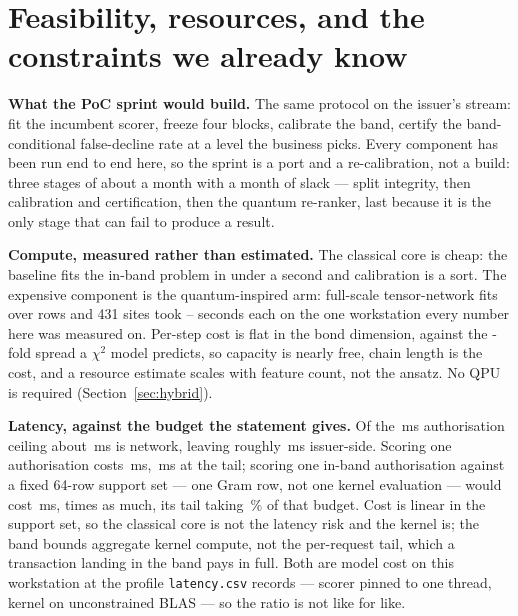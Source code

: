 \section{Feasibility, resources, and the constraints we already know}
\label{sec:feasibility}

\textbf{What the PoC sprint would build.} The same protocol on the issuer's stream: fit the
incumbent scorer, freeze four blocks, calibrate the band, certify the band-conditional
false-decline rate at a level the business picks. Every component has been run end to end here, so the sprint is a port and a re-calibration, not a build: three stages of about a month with a month of slack --- split integrity, then calibration and
certification, then the quantum re-ranker, last because it is the only stage that can fail to
produce a result.

\textbf{Compute, measured rather than estimated.} The classical core is cheap: the baseline fits the in-band problem in under a second and calibration is a sort.
The expensive component is the quantum-inspired arm: \ClaimSweepJobs{} full-scale
tensor-network fits over \ClaimSweepTrainRows{} rows and 431 sites took
\ClaimSweepSecondsMin{}--\ClaimSweepSecondsMax{} seconds each on the one
 workstation every number here was
measured on. Per-step cost is flat in the bond dimension, against the
\ClaimSweepChiFlopSpan{}-fold spread a $\chi^2$ model predicts, so capacity is nearly free, chain length is the cost, and a resource estimate scales with feature count, not the ansatz. No QPU is required (Section~\ref{sec:hybrid}).

\textbf{Latency, against the budget the statement gives.} Of the
\ClaimLatencyAuthorisationBudgetMs{}\,ms authorisation ceiling about \ClaimLatencyNetworkMs{}\,ms
is network, leaving roughly \ClaimLatencyBudgetResidualMs{}\,ms issuer-side. Scoring one
authorisation costs \ClaimLatencyScorerMedian{}\,ms, \ClaimLatencyScorerTail{}\,ms at the tail;
scoring one in-band authorisation against a fixed 64-row support set --- one Gram row, not one
kernel evaluation --- would cost \ClaimLatencyKernelMedian{}\,ms, \ClaimLatencyKernelVersusScorer{}
times as much, its tail taking \ClaimLatencyKernelBudgetShare\,\% of that budget. Cost is linear
in the support set, so the classical core is not the latency risk and the kernel is; the band
bounds aggregate kernel compute, not the per-request tail, which a transaction landing in the
band pays in full. Both are model cost on this workstation at the profile
\texttt{latency.csv} records --- scorer pinned to one thread, kernel on unconstrained BLAS ---
so the ratio is not like for like.

